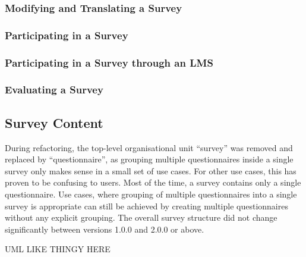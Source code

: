 \documentclass[a4paper,11pt]{article}
\begin{document}
                \subsubsection{Modifying and Translating a Survey}
                \subsubsection{Participating in a Survey}
                \subsubsection{Participating in a Survey through an LMS}
                \subsubsection{Evaluating a Survey}

            \subsection{Survey Content}
                During refactoring, the top-level organisational unit ``survey'' was removed
                and replaced by ``questionnaire'', as grouping multiple questionnaires
                inside a single survey only makes sense in a small set of use cases.
                For other use cases, this has proven to be confusing to users. Most of the time, 
                a survey contains only a single questionnaire. Use cases, where
                grouping of multiple questionnaires into a single survey is appropriate
                can still be achieved by creating multiple questionnaires without any
                explicit grouping. The overall survey structure did not change significantly
                between versions 1.0.0 and 2.0.0 or above.

                UML LIKE THINGY HERE
\end{document}
